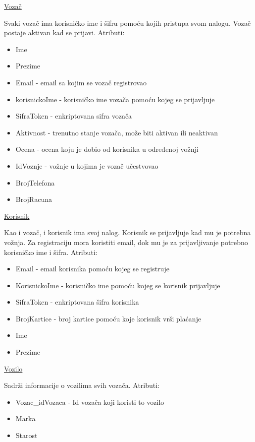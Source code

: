 \begin{flushleft}
\underline{Vozač}
\end{flushleft}
Svaki vozač ima korisničko ime i šifru pomoću kojih pristupa svom nalogu. Vozač postaje aktivan kad se prijavi. Atributi:
\begin{itemize}
    \item Ime
    \item Prezime
    \item Email - email sa kojim se vozač registrovao
    \item korisnickoIme - korisničko ime vozača pomoću kojeg se prijavljuje
    \item SifraToken - enkriptovana sifra vozača
    \item Aktivnost - trenutno stanje vozača, može biti aktivan ili neaktivan
    \item Ocena - ocena koju je dobio od korisnika u određenoj vožnji
    \item IdVoznje - vožnje u kojima je vozač učestvovao
    \item BrojTelefona
    \item BrojRacuna
\end{itemize}

\begin{flushleft}
\underline{Korisnik}
\end{flushleft}
Kao i vozač, i korisnik ima svoj nalog. Korisnik se prijavljuje kad mu je potrebna vožnja. Za registraciju mora koristiti email, dok mu je za prijavljivanje potrebno korisničko ime i šifra. Atributi:
\begin{itemize}
    \item Email - email korisnika pomoću kojeg se registruje
    \item KorisnickoIme - korisničko ime pomoću kojeg se korisnik prijavljuje
    \item SifraToken - enkriptovana šifra korisnika
    \item BrojKartice - broj kartice pomoću koje korisnik vrši plaćanje
    \item Ime
    \item Prezime
\end{itemize}

\begin{flushleft}
\underline{Vozilo}
\end{flushleft}
Sadrži informacije o vozilima svih vozača. Atributi:
\begin{itemize}
    \item Vozac\_idVozaca - Id vozača koji koristi to vozilo
    \item Marka
    \item Starost
\end{itemize}

